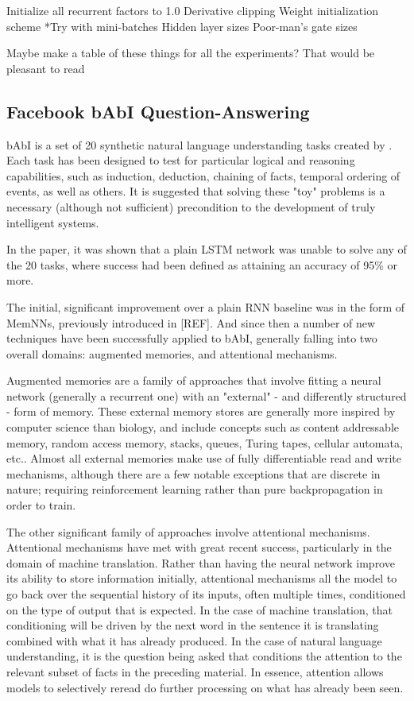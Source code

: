 \documentclass{article}
\begin{document}
Initialize all recurrent factors to 1.0
Derivative clipping
Weight initialization scheme
*Try with mini-batches
Hidden layer sizes
Poor-man’s gate sizes

Maybe make a table of these things for all the experiments? That would be pleasant to read

\subsection{Facebook bAbI Question-Answering}

bAbI is a set of 20 synthetic natural language understanding tasks created by \citet{2015arXiv150205698W}. Each task has been designed to test for particular logical and reasoning capabilities, such as induction, deduction, chaining of facts, temporal ordering of events, as well as others. It is suggested that solving these "toy" problems is a necessary (although not sufficient) precondition to the development of truly intelligent systems.

In the paper, it was shown that a plain LSTM network was unable to solve any of the 20 tasks, where success had been defined as attaining an accuracy of 95\% or more.

The initial, significant improvement over a plain RNN baseline was in the form of MemNNs, previously introduced in [REF]. And since then a number of new techniques have been successfully applied to bAbI, generally falling into two overall domains: augmented memories, and attentional mechanisms.

Augmented memories are a family of approaches that involve fitting a neural network (generally a recurrent one) with an "external" - and differently structured - form of memory. These external memory stores are generally more inspired by computer science than biology, and include concepts such as content addressable memory, random access memory, stacks, queues, Turing tapes, cellular automata, etc.. Almost all external memories make use of fully differentiable read and write mechanisms, although there are a few notable exceptions that are discrete in nature; requiring reinforcement learning rather than pure backpropagation in order to train.

The other significant family of approaches involve attentional mechanisms. Attentional mechanisms have met with great recent success, particularly in the domain of machine translation. Rather than having the neural network improve its ability to store information initially, attentional mechanisms all the model to go back over the sequential history of its inputs, often multiple times, conditioned on the type of output that is expected. In the case of machine translation, that conditioning will be driven by the next word in the sentence it is translating combined with what it has already produced. In the case of natural language understanding, it is the question being asked that conditions the attention to the relevant subset of facts in the preceding material. In essence, attention allows models to selectively reread do further processing on what has already been seen.
\end{document}
